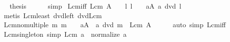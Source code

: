 \begin{isabellebody}
\ \isamarkupfalse%
\ {\isacharquery}{\kern0pt}thesis\isanewline
\ \ \ \ \isamarkupfalse%
\ simp\isanewline
{}\isamarkupfalse%
%
\endisatagproof
{\isafoldproof}%
%
\isadelimproof
\isanewline
%
\endisadelimproof
\isanewline
{}\isamarkupfalse%
\ Lcm{\isacharunderscore}{\kern0pt}{}{\isacharunderscore}{\kern0pt}iff{\isacharprime}{\kern0pt}{\isacharcolon}{\kern0pt}\ {\isachardoublequoteopen}Lcm\ A\ {\isacharequal}{\kern0pt}\ {}\ {\isasymlongleftrightarrow}\ {\isacharparenleft}{\kern0pt}{\isasymnexists}l{\isachardot}{\kern0pt}\ l\ {\isasymnoteq}\ {}\ {\isasymand}\ {\isacharparenleft}{\kern0pt}{\isasymforall}a{\isasymin}A{\isachardot}{\kern0pt}\ a\ dvd\ l{\isacharparenright}{\kern0pt}{\isacharparenright}{\kern0pt}{\isachardoublequoteclose}\isanewline
%
\isadelimproof
\ \ %
\endisadelimproof
%
\isatagproof
{}\isamarkupfalse%
\ {\isacharparenleft}{\kern0pt}metis\ Lcm{\isacharunderscore}{\kern0pt}least\ dvd{\isacharunderscore}{\kern0pt}{}{\isacharunderscore}{\kern0pt}left\ dvd{\isacharunderscore}{\kern0pt}Lcm{\isacharparenright}{\kern0pt}%
\endisatagproof
{\isafoldproof}%
%
\isadelimproof
\isanewline
%
\endisadelimproof
\isanewline
{}\isamarkupfalse%
\ Lcm{\isacharunderscore}{\kern0pt}no{\isacharunderscore}{\kern0pt}multiple{\isacharcolon}{\kern0pt}\ {\isachardoublequoteopen}{\isacharparenleft}{\kern0pt}{\isasymforall}m{\isachardot}{\kern0pt}\ m\ {\isasymnoteq}\ {}\ {\isasymlongrightarrow}\ {\isacharparenleft}{\kern0pt}{\isasymexists}a{\isasymin}A{\isachardot}{\kern0pt}\ {\isasymnot}\ a\ dvd\ m{\isacharparenright}{\kern0pt}{\isacharparenright}{\kern0pt}\ {\isasymLongrightarrow}\ Lcm\ A\ {\isacharequal}{\kern0pt}\ {}{\isachardoublequoteclose}\isanewline
%
\isadelimproof
\ \ %
\endisadelimproof
%
\isatagproof
{}\isamarkupfalse%
\ {\isacharparenleft}{\kern0pt}auto\ simp{\isacharcolon}{\kern0pt}\ Lcm{\isacharunderscore}{\kern0pt}{}{\isacharunderscore}{\kern0pt}iff{\isacharprime}{\kern0pt}{\isacharparenright}{\kern0pt}%
\endisatagproof
{\isafoldproof}%
%
\isadelimproof
\isanewline
%
\endisadelimproof
\isanewline
{}\isamarkupfalse%
\ Lcm{\isacharunderscore}{\kern0pt}singleton\ {\isacharbrackleft}{\kern0pt}simp{\isacharbrackright}{\kern0pt}{\isacharcolon}{\kern0pt}\ {\isachardoublequoteopen}Lcm\ {\isacharbraceleft}{\kern0pt}a{\isacharbraceright}{\kern0pt}\ {\isacharequal}{\kern0pt}\ normalize\ a{\isachardoublequoteclose}\isanewline
%
\isadelimproof
\ \ %
\endisadelimproof

\end{isabellebody}
